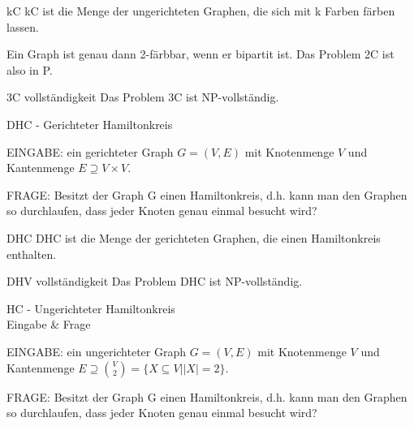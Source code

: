 \documentclass[avery5371, frame]{flashcards}
\begin{document}
\begin{flashcard}[Definition]{kC}
    kC ist die Menge der ungerichteten Graphen, die sich mit k Farben färben lassen.

    Ein Graph ist genau dann 2-färbbar, wenn er bipartit ist. Das Problem 2C ist also in P.
\end{flashcard}

\begin{flashcard}[Satz]{ 3C vollständigkeit}
    Das Problem 3C ist NP-vollständig.
\end{flashcard}

\begin{flashcard}{DHC - Gerichteter Hamiltonkreis}
    \begin{itemize*}
        \item EINGABE: ein gerichteter Graph $G = (V , E )$ mit Knotenmenge $V$ und Kantenmenge $E\supseteq V\times V$.
        \item FRAGE: Besitzt der Graph G einen Hamiltonkreis, d.h. kann man den Graphen so durchlaufen, dass jeder Knoten genau einmal besucht wird?
    \end{itemize*}
\end{flashcard}

\begin{flashcard}[Definition]{DHC}
    DHC ist die Menge der gerichteten Graphen, die einen Hamiltonkreis enthalten.
\end{flashcard}

\begin{flashcard}[Satz]{DHV vollständigkeit}
    Das Problem DHC ist NP-vollständig.
\end{flashcard}

\begin{flashcard}{HC - Ungerichteter Hamiltonkreis\\Eingabe \& Frage}
    \begin{itemize*}
        \item EINGABE: ein ungerichteter Graph $G=(V,E)$ mit Knotenmenge $V$ und Kantenmenge $E\supseteq \binom{V}{2} = \{X\subseteq V | |X|=2\}$.
        \item FRAGE: Besitzt der Graph G einen Hamiltonkreis, d.h. kann man den Graphen so durchlaufen, dass jeder Knoten genau einmal besucht wird?
    \end{itemize*}
\end{flashcard}
\end{document}
